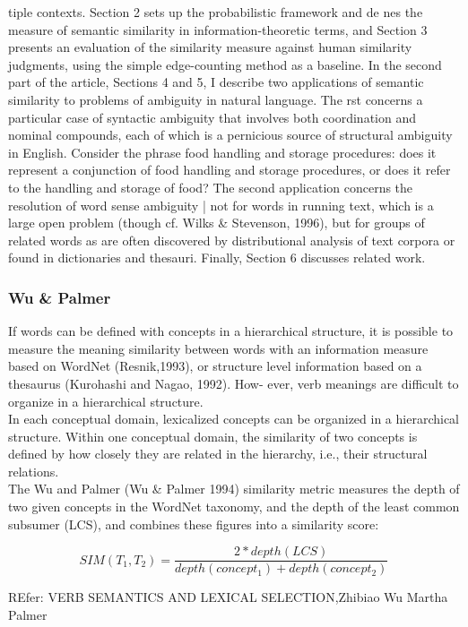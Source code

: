tiple contexts. Section 2 sets up the probabilistic framework and de nes the measure of semantic similarity in information-theoretic terms, and Section 3 presents an evaluation of the similarity measure against human similarity judgments, using the simple edge-counting method as a baseline.
    In the second part of the article, Sections 4 and 5, I describe two applications of semantic similarity to problems of ambiguity in natural language. The rst concerns a particular case of syntactic ambiguity that involves both coordination and nominal compounds, each of which is a pernicious source of structural ambiguity in English. Consider the phrase food handling and storage procedures: does it represent a conjunction of food handling and storage procedures, or does it refer to the handling and storage of food? The second application concerns the resolution of word sense ambiguity | not for words in running text, which is a large open problem (though cf. Wilks & Stevenson, 1996), but for groups of related words
as are often discovered by distributional analysis of text corpora or found in dictionaries and thesauri. Finally, Section 6 discusses related work.
\subsubsection{Wu \& Palmer}
    If words can be defined with concepts in a hierarchical structure, it is possible to measure the meaning similarity between words with an information measure based on WordNet (Resnik,1993), or structure level information based on a thesaurus (Kurohashi and Nagao, 1992). How-
ever, verb meanings are difficult to organize in a hierarchical structure.\\
In each conceptual domain, lexicalized concepts can be organized in a hierarchical structure. Within one conceptual domain, the similarity of two concepts is defined by how closely they are related in the hierarchy, i.e., their structural relations.\\

The Wu and Palmer (Wu & Palmer 1994) similarity metric measures the depth of two given concepts in the WordNet taxonomy, and the depth of the least common subsumer (LCS), and combines these figures into a similarity score:

\begin{equation}
SIM({T_{1}},{T_{2}}) =\frac{2 * depth(LCS)}{depth(concept_1)+ depth(concept_2)} 
\end{equation}

REfer: VERB SEMANTICS AND LEXICAL  SELECTION,Zhibiao Wu Martha Palmer


